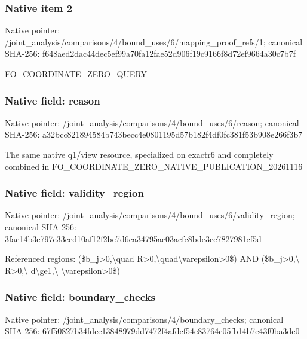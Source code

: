 \documentclass[10pt,a4paper]{article}
\begin{document}
\subsubsection{Native item 2}
Native pointer: /joint\_\allowbreak{}analysis/comparisons/4/bound\_\allowbreak{}uses/6/mapping\_\allowbreak{}proof\_\allowbreak{}refs/1; canonical SHA-256: f648aed2dac44dec5ef99a70fa12fae52d906f19c9166f8d72ef9664a30c7b7f

\begingroup\raggedright\sloppy FO\_\allowbreak{}COORDINATE\_\allowbreak{}ZERO\_\allowbreak{}QUERY\par\endgroup

\subsubsection{Native field: reason}
Native pointer: /joint\_\allowbreak{}analysis/comparisons/4/bound\_\allowbreak{}uses/6/reason; canonical SHA-256: a32bcc821894584b743becc4e0801195d57b182f4df0fc381f53b908e266f3b7

\begingroup\raggedright\sloppy The same native q1/\allowbreak{}view resource,\allowbreak{} specialized on exactr6 and completely combined in FO\_\allowbreak{}COORDINATE\_\allowbreak{}ZERO\_\allowbreak{}NATIVE\_\allowbreak{}PUBLICATION\_\allowbreak{}20261116\par\endgroup

\subsubsection{Native field: validity\_\allowbreak{}region}
Native pointer: /joint\_\allowbreak{}analysis/comparisons/4/bound\_\allowbreak{}uses/6/validity\_\allowbreak{}region; canonical SHA-256: 3fac14b3e797c33ced10af12f2be7d6ca34795ac03acfc8bde3cc7827981cf5d

\begingroup\raggedright\sloppy Referenced regions:\allowbreak{} (\$b\_\allowbreak{}j>0,\allowbreak{}\textbackslash{}quad R>0,\allowbreak{}\textbackslash{}quad\textbackslash{}varepsilon>0\$) AND (\$b\_\allowbreak{}j>0,\allowbreak{}\textbackslash{} R>0,\allowbreak{}\textbackslash{} d\textbackslash{}ge1,\allowbreak{}\textbackslash{} \textbackslash{}varepsilon>0\$)\par\endgroup

\subsubsection{Native field: boundary\_\allowbreak{}checks}
Native pointer: /joint\_\allowbreak{}analysis/comparisons/4/boundary\_\allowbreak{}checks; canonical SHA-256: 67f50827b34fdce13848979dd7472f4afdcf54e83764c05fb14b7e43f0ba3dc0
\end{document}
